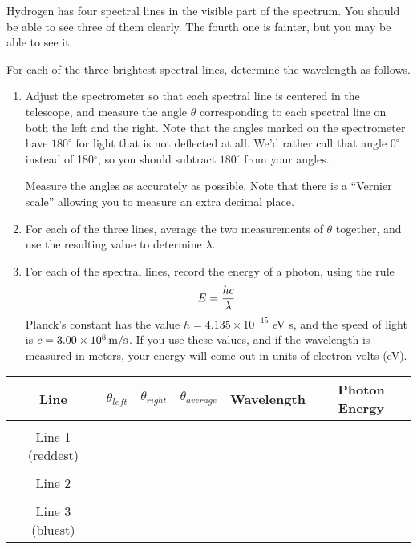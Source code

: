 Hydrogen has four spectral lines in the visible part
of the spectrum.  You should be able to see three of them clearly.
The fourth one is fainter, but you may be able to see it.

For each of the three brightest spectral lines, determine
the wavelength as follows.  

\begin{enumerate}
\item Adjust the spectrometer so that each spectral
line is centered in the telescope, and measure the angle $\theta$
corresponding to each spectral line on both the left and the right.
Note that the angles marked on the spectrometer have $180^\circ$
for light that is not deflected at all.  We'd rather
call that angle $0^\circ$ instead of 180$^\circ$, so you should
subtract $180^\circ$ from your angles.

Measure the angles as accurately as possible.  Note that there is 
a ``Vernier scale'' allowing you to measure an extra decimal place.

\item For each of the three lines, average the two measurements of
$\theta$ together, and use the resulting value to determine $\lambda$.

\item For each of the spectral lines, record the energy of a photon,
using the rule 
$$
E={hc\over\lambda}.
$$
Planck's constant has the value $h=4.135\times 10^{-15}$ eV s, and
the speed of light is $c=3.00\times 10^8\,{\rm m/s}$.  If you use these
values, and if the wavelength is measured in meters, your energy
will come out in units of electron volts (eV).
\end{enumerate}


\begin{center}
\begin{tabular}{|c|c|c|c|c|c|}\hline
Line        & $\theta_{left}$     & $\theta_{right}$     & $\theta_{average}$ & Wavelength  & Photon Energy \\ 
\hline
& & & & & \\
Line 1 (reddest)  &                             &                              &                    &                    &   \\ \hline
& & & & & \\
Line 2   &                             &                              &                    &                    &   \\ \hline
& & & & & \\
Line 3 (bluest)  &                             &                              &                    &                    &   \\ \hline
\end{tabular}
\end{center}

